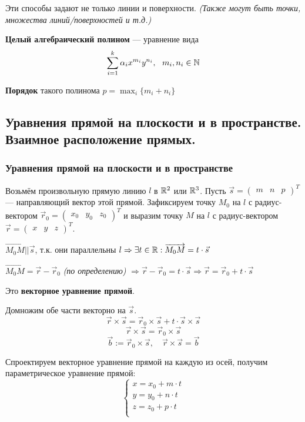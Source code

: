 Эти способы задают не только линии и поверхности. \textit{(Также могут быть точки, множества линий/поверхностей и т.д.)}

\begin{definition}
    \textbf{Целый алгебраический полином} --- уравнение вида $$\sum\limits_{i=1}^k\alpha_ix^{m_i}y^{n_i},\ \ m_i,n_i\in\N$$

    \textbf{Порядок} такого полинома $p=\max_{i}\{m_i+n_i\}$
\end{definition}

\subsection{Уравнения прямой на плоскости и в пространстве. Взаимное расположение прямых.}
\subsubsection{Уравнения прямой на плоскости и в пространстве}
Возьмём произвольную прямую линию $l$ в $\mathbb{R}^2$ или $\mathbb{R}^3$. Пусть $\vec s=\begin{pmatrix} m & n & p\end{pmatrix}^T$ --- направляющий вектор этой прямой. Зафиксируем точку $M_0$ на $l$ с радиус-вектором $\vec r_0=\begin{pmatrix}x_0&y_0&z_0\end{pmatrix}^T$ и выразим точку $M$ на $l$ с радиус-вектором $\vec r=\begin{pmatrix}x&y&z\end{pmatrix}^T$.

$\overrightarrow{M_0M} || \vec s$, т.к. они параллельны $l \Rightarrow \exists t\in\mathbb{R}:\overrightarrow{M_0M}=t\cdot\vec s$

$\overrightarrow{M_0M}=\vec r-\vec r_0$ \textit{(по определению)} $\Rightarrow \vec r-\vec r_0=t\cdot\vec s\Rightarrow \vec r=\vec r_0+t\cdot \vec s$

\begin{definition}
    Это \textbf{векторное уравнение прямой}.
\end{definition}

Домножим обе части векторно на $\vec s$.
$$\vec r\times\vec s=\vec r_0\times\vec s+t\cdot\vec s\times\vec s$$
$$\vec r\times\vec s=\vec r_0\times\vec s$$
$$\vec b:=\vec r_0\times\vec s, \quad \vec r\times\vec s=\vec b$$

Спроектируем векторное уравнение прямой на каждую из осей, получим параметрическое уравнение прямой:
$$\begin{cases}
    x=x_0+m\cdot t \\
    y=y_0+n\cdot t \\
    z=z_0+p\cdot t \\
\end{cases}$$

